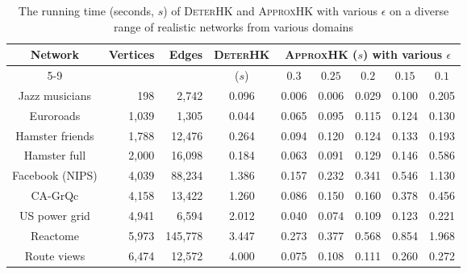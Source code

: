 \documentclass[10pt,twocolumn,twoside]{IEEEtran}
\begin{document}
\begin{table}[htbp]
    \centering
    \normalsize
    \fontsize{8.0}{8.8}\selectfont
    \begin{threeparttable}
        \caption{The running time (seconds, \(s\)) of \textsc{DeterHK} and \textsc{ApproxHK} with various \(\epsilon\) on a diverse range of realistic networks from various domains}
        \label{tab:runtime_comparison}
        \begin{tabular}{crrcccccc}
            \toprule
            \multirow{2}{*}{Network}          &
            \multirow{2}{*}{Vertices}         &
            \multirow{2}{*}{Edges}            &
            \multirow{2}{*}{\textsc{DeterHK}} &
            \multicolumn{5}{c}{\textsc{ApproxHK} (\(s\)) with various \(\epsilon\)}                                                 \\
            \cmidrule{5-9}                    &           &           & (\(s\)) & \(0.3\) & \(0.25\) & \(0.2\) & \(0.15\) & \(0.1\) \\
            \midrule
            Jazz musicians                    & 198       & 2,742     & 0.096   & 0.006   & 0.006    & 0.029   & 0.100    & 0.205   \\
            Euroroads                         & 1,039     & 1,305     & 0.044   & 0.065   & 0.095    & 0.115   & 0.124    & 0.130   \\
            Hamster friends                   & 1,788     & 12,476    & 0.264   & 0.094   & 0.120    & 0.124   & 0.133    & 0.193   \\
            Hamster full                      & 2,000     & 16,098    & 0.184   & 0.063   & 0.091    & 0.129   & 0.146    & 0.586   \\
            Facebook (NIPS)                   & 4,039     & 88,234    & 1.386   & 0.157   & 0.232    & 0.341   & 0.546    & 1.130   \\
            CA-GrQc                           & 4,158     & 13,422    & 1.260   & 0.086   & 0.150    & 0.160   & 0.378    & 0.456   \\
            US power grid                     & 4,941     & 6,594     & 2.012   & 0.040   & 0.074    & 0.109   & 0.123    & 0.221   \\
            Reactome                          & 5,973     & 145,778   & 3.447   & 0.273   & 0.377    & 0.568   & 0.854    & 1.968   \\
            Route views                       & 6,474     & 12,572    & 4.000   & 0.075   & 0.108    & 0.111   & 0.260    & 0.272   \\

\end{tabular}
\end{threeparttable}
\end{table}
\end{document}
